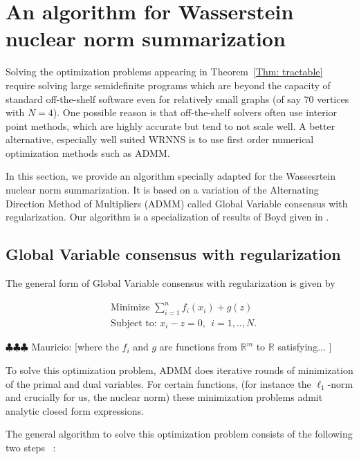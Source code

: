 \documentclass[12pt]{amsart}
\theoremstyle{remark}
\newcommand{\RR}{\mathbb{R}}
\newcommand{\mv}[1]{{\color{red} \sf $\clubsuit\clubsuit\clubsuit$ Mauricio: [#1]}}
\begin{document}
\section{An algorithm for Wasserstein nuclear norm summarization }



Solving the optimization problems appearing in Theorem~\ref{Thm: tractable} require solving large semidefinite programs which are beyond the  capacity of standard off-the-shelf software even for relatively small graphs (of say $70$ vertices with $N=4$). One possible reason is that off-the-shelf solvers often use interior point methods, which are highly accurate but tend to not scale well. A better alternative, especially well suited WRNNS is to use first order numerical optimization methods such as ADMM.

In this section, we provide an algorithm specially adapted for the Wassesrtein nuclear norm summarization. It is based on a variation of the Alternating Direction Method of Multipliers (ADMM) called Global Variable consensus with regularization. Our algorithm is a specialization of results of Boyd given in \cite{boyd2011distributed}.


\subsection{Global Variable consensus with regularization}


The general form of Global Variable consensus with regularization is given by 

\begin{equation}\label{GVC}
\begin{aligned}
& \text{Minimize   } \sum_{i=1}^n f_i(x_i)+g(z) \\
&\text{Subject to: } x_i-z = 0, \ \ i=1,..,N. 
\end{aligned}
\end{equation}


\mv{where the $f_i$ and $g$ are functions from $\RR^m$ to $\RR$ satisfying... }

To solve this optimization problem, ADMM does iterative rounds of minimization of the primal and dual variables. For certain functions, (for instance the $\ell_1$-norm and crucially for us, the nuclear norm) these minimization problems admit analytic closed form expressions. 


The general algorithm to solve this optimization problem consists of the following  two steps~ \cite{boyd2011distributed}:
\end{document}
